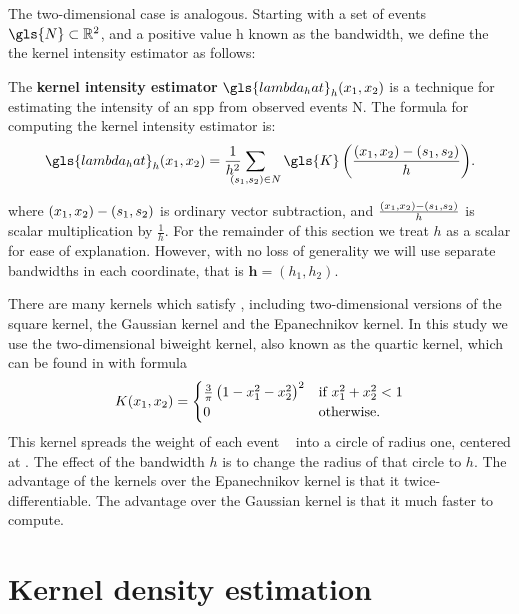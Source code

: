 The two-dimensional case is analogous.
Starting with a set of \glspl{event} $\gls{N} \subset \RS$,
and a positive value \gls{h} known as the bandwidth,
we define the the \gls{kernel intensity estimator} as follows:
\begin{defn}
    \label{defn:lambda_hat}
    The \textbf{\gls{kernel intensity estimator}} $\gls{lambda_hat}_h \xvec$
    is a technique for estimating the \gls{intensity} of an \gls{spp}
    from observed \glspl{event} \gls{N}.
    The formula for computing the \gls{kernel intensity estimator} is:
    \begin{equation}
        \label{eq:lambda_hat}
        \gls{lambda_hat}_h \xvec%
            = \sumS{\gls{K}\left( \frac{\xvec-(s_1, s_2)}{h} \right)} \text{.}%
    \end{equation}
\end{defn}
where $(x_1, x_2)-(s_1, s_2)$ is ordinary vector subtraction,
and $\frac{(x_1, x_2)-(s_1, s_2)}{h}$ is scalar multiplication by $\frac{1}{h}$.
For the remainder of this section we treat $h$ as a scalar for ease of explanation.
However, with no loss of generality we will use separate bandwidths in each coordinate,
that is $\mathbf{h}=(h_1, h_2)$.

There are many kernels which satisfy ,
including two-dimensional versions of the square kernel, the Gaussian kernel and the Epanechnikov kernel.
In this study we use the two-dimensional biweight kernel,
also known as the quartic kernel,
which can be found in \citet{silverman1986density} with formula
\begin{equation}
    \label{eq:biweightkernel2d}
    K \xvec =%
    \begin{cases}%
        \frac{3}{\pi}\left( 1 - x_1^2 - x_2^2 \right)^2 & \text{if}~x_1^2+x_2^2<1 \\%
        0 & \text{otherwise.}%
    \end{cases}%
\end{equation}
This kernel spreads the weight of each event \xvec~ into a circle of radius one, centered at \xvec.
The effect of the bandwidth $h$ is to change the radius of that circle to $h$.
The advantage of the kernels over the Epanechnikov kernel is that it twice-differentiable.
The advantage over the Gaussian kernel is that it much faster to compute.

\section{Kernel density estimation}
 
